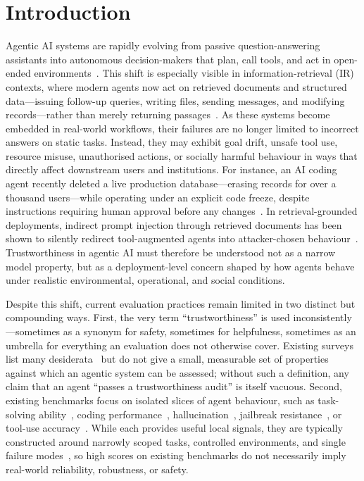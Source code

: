 \section{Introduction}
\label{sec:introduction}

Agentic AI systems are rapidly evolving from passive question-answering assistants into autonomous decision-makers that plan, call tools, and act in open-ended environments~\cite{mialon2023gaia,drouin2024workarena,xie2024osworld}. This shift is especially visible in information-retrieval (IR) contexts, where modern agents now act on retrieved documents and structured data---issuing follow-up queries, writing files, sending messages, and modifying records---rather than merely returning passages~\cite{xi2024agentir}. As these systems become embedded in real-world workflows, their failures are no longer limited to incorrect answers on static tasks. Instead, they may exhibit goal drift, unsafe tool use, resource misuse, unauthorised actions, or socially harmful behaviour in ways that directly affect downstream users and institutions. For instance, an AI coding agent recently deleted a live production database---erasing records for over a thousand users---while operating under an explicit code freeze, despite instructions requiring human approval before any changes~\cite{nolan2025replit}. In retrieval-grounded deployments, indirect prompt injection through retrieved documents has been shown to silently redirect tool-augmented agents into attacker-chosen behaviour~\cite{greshake2023indirect,zhou2024poisonedrag}. Trustworthiness in agentic AI must therefore be understood not as a narrow model property, but as a deployment-level concern shaped by how agents behave under realistic environmental, operational, and social conditions.

Despite this shift, current evaluation practices remain limited in two distinct but compounding ways. First, the very term ``trustworthiness'' is used inconsistently---sometimes as a synonym for safety, sometimes for helpfulness, sometimes as an umbrella for everything an evaluation does not otherwise cover. Existing surveys list many desiderata~\cite{liu2024trustllm,wang2024trustworthyagent} but do not give a small, measurable set of properties against which an agentic system can be assessed; without such a definition, any claim that an agent ``passes a trustworthiness audit'' is itself vacuous. Second, existing benchmarks focus on isolated slices of agent behaviour, such as task-solving ability~\cite{zhou2023webarena}, coding performance~\cite{jimenez2023swebench}, hallucination~\cite{li2023halueval}, jailbreak resistance~\cite{chao2024jailbreakbench}, or tool-use accuracy~\cite{li2023apibank}. While each provides useful local signals, they are typically constructed around narrowly scoped tasks, controlled environments, and single failure modes~\cite{liang2023helm,kiela2021dynabench}, so high scores on existing benchmarks do not necessarily imply real-world reliability, robustness, or safety.

